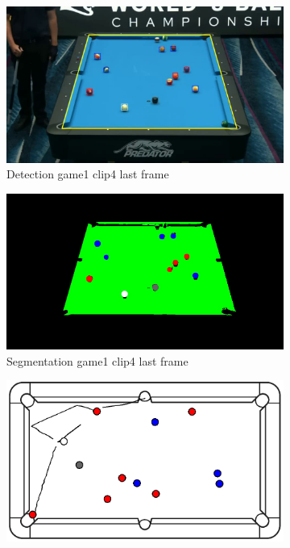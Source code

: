 \begin{figure}[H]
\begin{subfigure}[b]{0.48\textwidth}
        \centering
        \includegraphics[width=\textwidth]{images/Detection/game1_clip4_detected_balls_last_frame.jpg}
        \caption{Detection game1 clip4 last frame}
        \label{fig: game1_clip4_last_frame_detected}
    \end{subfigure}
    \begin{subfigure}[b]{0.48\textwidth}
        \centering
        \includegraphics[width=\textwidth]{images/Segmentation/game1_clip4_segmented_balls_last_frame.jpg}
        \caption{Segmentation game1 clip4 last frame}
		\label{fig: game1_clip4_last_frame_segmented}
    \end{subfigure}
    \begin{subfigure}[b]{0.48\textwidth}
    	\centering
    	\includegraphics[width=\textwidth]{images/AllMinimap/game1_clip4_minimap.png}

\end{subfigure}
\end{figure}
